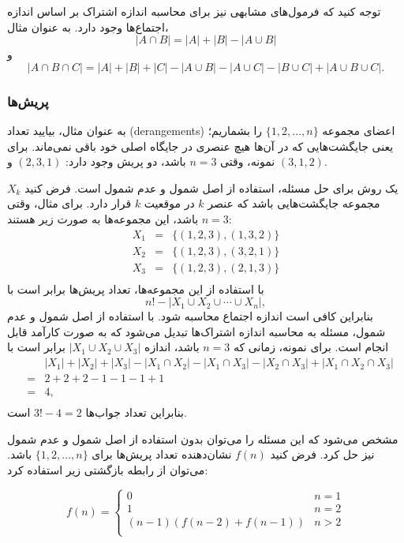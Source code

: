 توجه کنید که فرمول‌های مشابهی نیز برای محاسبه اندازه اشتراک بر اساس اندازه اجتماع‌ها وجود دارد. به عنوان مثال،
\[ |A \cap B| = |A| + |B| - |A \cup B|\]
و
\[ |A \cap B \cap C| = |A| + |B| + |C| - |A \cup B|  - |A \cup C|  - |B \cup C| + |A \cup B \cup C| .\]

\subsubsection{پریش‌ها}


به عنوان مثال، بیایید تعداد  (derangements) اعضای مجموعه $\{1,2,\ldots,n\}$ را بشماریم؛ یعنی جایگشت‌هایی که در آن‌ها هیچ عنصری در جایگاه اصلی خود باقی نمی‌ماند.
برای نمونه، وقتی $n=3$ باشد، دو پریش وجود دارد: $(2,3,1)$ و $(3,1,2)$.

یک روش برای حل مسئله، استفاده از اصل شمول و عدم شمول است.
فرض کنید $X_k$ مجموعه جایگشت‌هایی باشد که عنصر $k$ در موقعیت $k$ قرار دارد.
برای مثال، وقتی $n=3$ باشد، این مجموعه‌ها به صورت زیر هستند:
\[
\begin{array}{lcl}
X_1 & = & \{(1,2,3),(1,3,2)\} \\
X_2 & = & \{(1,2,3),(3,2,1)\} \\
X_3 & = & \{(1,2,3),(2,1,3)\} \\
\end{array}
\]
با استفاده از این مجموعه‌ها، تعداد پریش‌ها برابر است با
\[ n! - |X_1 \cup X_2 \cup \cdots \cup X_n|, \]
بنابراین کافی است اندازه اجتماع محاسبه شود.
با استفاده از اصل شمول و عدم شمول، مسئله به محاسبه اندازه اشتراک‌ها تبدیل می‌شود که به صورت کارآمد قابل انجام است.
برای نمونه، زمانی که $n=3$ باشد، اندازه $|X_1 \cup X_2 \cup X_3|$ برابر است با
\[
\begin{array}{lcl}
 & & |X_1| + |X_2| + |X_3| - |X_1 \cap X_2|  - |X_1 \cap X_3|  - |X_2 \cap X_3| + |X_1 \cap X_2 \cap X_3| \\
 & = & 2+2+2-1-1-1+1 \\
 & = & 4, \\
\end{array}
\]
بنابراین تعداد جواب‌ها $3!-4=2$ است.

مشخص می‌شود که این مسئله را می‌توان بدون استفاده از اصل شمول و عدم شمول نیز حل کرد.
فرض کنید $f(n)$ نشان‌دهنده تعداد پریش‌ها برای $\{1,2,\ldots,n\}$ باشد. می‌توان از رابطه بازگشتی زیر استفاده کرد:

\begin{equation*}
    f(n) = \begin{cases}
               0               & n = 1\\
               1               & n = 2\\
               (n-1)(f(n-2) + f(n-1)) & n>2 \\
           \end{cases}
\end{equation*}

